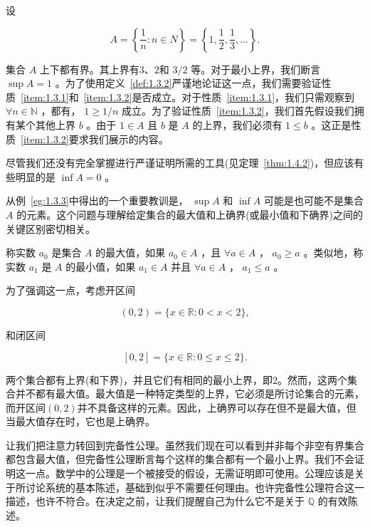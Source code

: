 \begin{Eg}
  \label{eg:1.3.3}
设

\[
A = \left\{  {\frac{1}{n} : n \in  N}\right\}   = \left\{  {1,\frac{1}{2},\frac{1}{3},\ldots }\right\}  .
\]

集合 \(A\) 上下都有界。其上界有$3$、$2$和 \(3/2\) 等。对于最小上界，我们断言 \(\sup A = 1\) 。为了使用定义~\ref{def:1.3.2}严谨地论证这一点，我们需要验证性质~\ref{item:1.3.1}和~\ref{item:1.3.2}是否成立。对于性质~\ref{item:1.3.1}，我们只需观察到 \( \forall n \in  \mathbb{N}\) ，都有， \(1 \geq  1/n\) 成立。为了验证性质~\ref{item:1.3.2}，我们首先假设我们拥有某个其他上界 \(b\) 。由于 \(1 \in  A\) 且 \(b\) 是 \(A\) 的上界，我们必须有 \(1 \leq  b\) 。这正是性质~\ref{item:1.3.2}要求我们展示的内容。

尽管我们还没有完全掌握进行严谨证明所需的工具(见定理~\ref{thm:1.4.2})，但应该有些明显的是 \(\inf A = 0\) 。
  
\end{Eg}

从例~\ref{eg:1.3.3}中得出的一个重要教训是， \(\sup A\) 和 \(\inf A\) 可能是也可能不是集合 \(A\) 的元素。这个问题与理解给定集合的最大值和上确界(或最小值和下确界)之间的关键区别密切相关。


\begin{Def}
  \label{def:1.3.4}
称实数 \({a}_{0}\) 是集合 \(A\) 的最大值，如果 \({a}_{0}\in A\) ，且 \(\forall a \in  A\) ， \({a}_{0} \geq  a\) 。类似地，称实数 \({a}_{1}\) 是 \(A\) 的最小值，如果 \({a}_{1} \in  A\) 并且 \(\forall a \in  A\) ， \({a}_{1} \leq  a\) 。  
\end{Def}

\begin{Eg}
  \label{eg:1.3.5}
为了强调这一点，考虑开区间

\[
\left( {0,2}\right)  = \{ x \in  \mathbb{R} : 0 < x < 2\} ,
\]

和闭区间

\[
\left\lbrack  {0,2}\right\rbrack   = \{ x \in  \mathbb{R} : 0 \leq  x \leq  2\} .
\]

两个集合都有上界(和下界)，并且它们有相同的最小上界，即$2$。然而，这两个集合并不都有最大值。最大值是一种特定类型的上界，它必须是所讨论集合的元素，而开区间$(0,2)$并不具备这样的元素。因此，上确界可以存在但不是最大值，但当最大值存在时，它也是上确界。  
\end{Eg}

让我们把注意力转回到完备性公理。虽然我们现在可以看到并非每个非空有界集合都包含最大值，但完备性公理断言每个这样的集合都有一个最小上界。我们不会证明这一点。数学中的公理是一个被接受的假设，无需证明即可使用。公理应该是关于所讨论系统的基本陈述，基础到似乎不需要任何理由。也许完备性公理符合这一描述，也许不符合。在决定之前，让我们提醒自己为什么它不是关于 \(\mathbb{Q}\) 的有效陈述。


